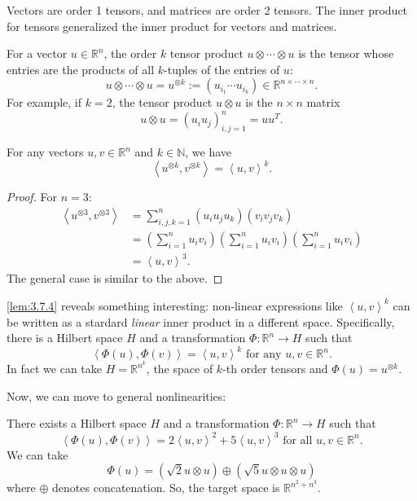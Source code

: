 \begin{example}
\label{ex:3.7.2}
Vectors are order 1 tensors, and matrices are order 2 tensors. The inner product for tensors generalized the 
inner product for vectors and matrices.
\end{example}

\begin{example}
\label{ex:3.7.3}
For a vector $u \in \mathbb{R}^n$, the order $k$ tensor product $u \otimes \cdots \otimes u$ is the tensor whose 
entries are the products of all $k$-tuples of the entries of $u$:
\[ u \otimes \cdots \otimes u = u^{\otimes k} := (u_{i_1} \cdots u_{i_k}) \in 
\mathbb{R}^{n \times \cdots \times n}. \]
For example, if $k = 2$, the tensor product $u \otimes u$ is the $n \times n$ matrix 
\[ u \otimes u = (u_iu_j)_{i, j = 1}^n = uu^T. \]
\end{example}

\begin{lemma}[Powers]
\label{lem:3.7.4}
For any vectors $u, v \in \mathbb{R}^n$ and $k \in \mathbb{N}$, we have 
\[ \left\langle u^{\otimes k}, v^{\otimes k} \right\rangle = \left\langle u, v \right\rangle^k. \]
\end{lemma}

\begin{proof}
For $n = 3$: 
\begin{align*}
	\left\langle u^{\otimes 3}, v^{\otimes 3} \right\rangle 
	&= \sum_{i, j, k = 1}^{n} (u_i u_j u_k)(v_iv_jv_k) \\
	&= \left( \sum_{i = 1}^{n}u_iv_i \right) \left( \sum_{i = 1}^{n}u_iv_i \right)
    \left( \sum_{i = 1}^{n}u_iv_i \right) \\
	&= \left\langle u, v \right\rangle^3.
\end{align*}
The general case is similar to the above.
\end{proof}

\cref{lem:3.7.4} reveals something interesting: non-linear expressions like $\left\langle u, v \right\rangle^k$ 
can be written as a stardard \textit{linear} inner product in a different space. Specifically, there is a 
Hilbert space $H$ and a transformation $\Phi: \mathbb{R}^n \to H$ such that 
\[ \left\langle \Phi(u), \Phi(v) \right\rangle = \left\langle u, v \right\rangle^k 
\text{ for any } u, v \in \mathbb{R}^n. \]
In fact we can take $H = \mathbb{R}^{n^k}$, the space of $k$-th order tensors and $\Phi(u) = u^{\otimes k}$. 

Now, we can move to general nonlinearities: 
\begin{example}
\label{ex:3.7.5}
There exists a Hilbert space $H$ and a transformation $\Phi: \mathbb{R}^n \to H$ such that 
\[ \left\langle \Phi(u), \Phi(v) \right\rangle = 2 \left\langle u, v \right\rangle^2 
+ 5 \left\langle u, v \right\rangle^3 \text{ for all } u, v \in \mathbb{R}^n. \]
We can take 
\[ \Phi(u) = (\sqrt{2}u \otimes u) \oplus (\sqrt{5}u \otimes u \otimes u) \]
where $\oplus$ denotes concatenation. So, the target space is $\mathbb{R}^{n^2 + n^3}$.
\end{example}

